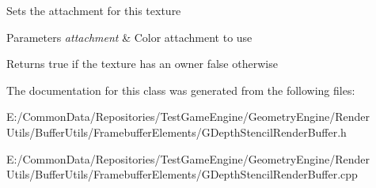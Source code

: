 Sets the attachment for this texture 
\begin{DoxyParams}{Parameters}
{\em attachment} & Color attachment to use \\
\hline
\end{DoxyParams}
\begin{DoxyReturn}{Returns}
true if the texture has an owner false otherwise 
\end{DoxyReturn}


The documentation for this class was generated from the following files\+:\begin{DoxyCompactItemize}
\item 
E\+:/\+Common\+Data/\+Repositories/\+Test\+Game\+Engine/\+Geometry\+Engine/\+Render Utils/\+Buffer\+Utils/\+Framebuffer\+Elements/G\+Depth\+Stencil\+Render\+Buffer.\+h\item 
E\+:/\+Common\+Data/\+Repositories/\+Test\+Game\+Engine/\+Geometry\+Engine/\+Render Utils/\+Buffer\+Utils/\+Framebuffer\+Elements/G\+Depth\+Stencil\+Render\+Buffer.\+cpp\end{DoxyCompactItemize}
